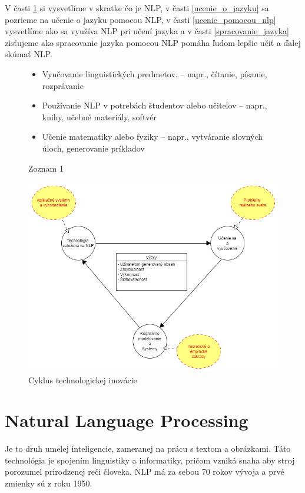 \documentclass[10pt,slovak,a4paper,twoside]{article}
\begin{document}
V časti \ref{NLP} si vysvetlíme v skratke čo je NLP, v časti \ref{ucenie_o_jazyku} sa pozrieme na učenie o jazyku pomocou NLP, 
v časti \ref{ucenie_pomocou_nlp} vysvetlíme ako sa využíva NLP pri učení jazyka a v časti \ref{spracovanie_jazyka} zisťujeme ako 
spracovanie jazyka pomocou NLP pomáha ľudom lepšie učiť a ďalej skúmať NLP.



\begin{framed}
	\centering
	\begin{figure}[H]
		\begin{itemize}\label{zoznam_1}
			\item Vyučovanie linguistických predmetov.
			– napr., čítanie, písanie, rozprávanie
			\item Používanie NLP v potrebách študentov alebo učiteľov
			– napr., knihy, učebné materiály, softvér
			\item Učenie matematiky alebo fyziky
			– napr., vytváranie slovných úloch, generovanie príkladov
		\end{itemize}
		\centering Zoznam 1
	\end{figure}
\end{framed}
\begin{framed}
	\begin{figure}[H]\label{nlp_obrazok}
		\includegraphics{nlp}
		\centering
		\caption{Cyklus technologickej inovácie}
	\end{figure}
\end{framed}
\section{Natural Language Processing} \label{NLP}
Je to druh umelej inteligencie, zameranej na prácu s textom a obrázkami.  
Táto technológia je spojením linguistiky a informatiky, 
pričom vzniká snaha aby stroj porozumel prirodzenej reči človeka.
NLP má za sebou 70 rokov vývoja a prvé zmienky sú z roku 1950\cite{historia}.
\end{document}
